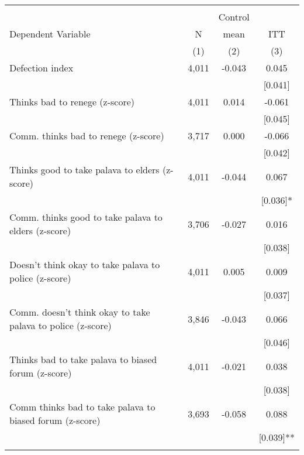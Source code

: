 \begin{tabular}{lccc}
\hline \noalign{\smallskip} &  &  & \\
 &  & Control & \\
Dependent Variable & N & mean & ITT\\
 & (1) & (2) & (3)\\
\noalign{\smallskip}\hline \noalign{\smallskip}\quad Defection index & 4,011 & -0.043 & 0.045\\
 &  &  & [0.041]\\
\quad Thinks bad to renege (z-score) & 4,011 & 0.014 & -0.061\\
 &  &  & [0.045]\\
\quad Comm. thinks bad to renege (z-score) & 3,717 & 0.000 & -0.066\\
 &  &  & [0.042]\\
\quad Thinks good to take palava to elders (z-score) & 4,011 & -0.044 & 0.067\\
 &  &  & [0.036]*\\
\quad Comm. thinks good to take palava to elders (z-score) & 3,706 & -0.027 & 0.016\\
 &  &  & [0.038]\\
\quad Doesn't think okay to take palava to police (z-score) & 4,011 & 0.005 & 0.009\\
 &  &  & [0.037]\\
\quad Comm. doesn't think okay to take palava to police (z-score) & 3,846 & -0.043 & 0.066\\
 &  &  & [0.046]\\
\quad Thinks bad to take palava to biased forum (z-score) & 4,011 & -0.021 & 0.038\\
 &  &  & [0.038]\\
\quad Comm thinks bad to take palava to biased forum (z-score) & 3,693 & -0.058 & 0.088\\
 &  &  & [0.039]**\\
\noalign{\smallskip}\hline\end{tabular}
